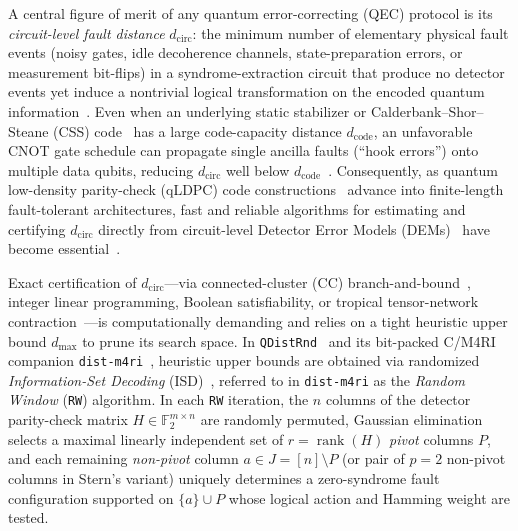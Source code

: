 \documentclass[12pt]{article}
\theoremstyle{definition}
\newcommand{\Ftwo}{\mathbb{F}_2}
\DeclareMathOperator{\rank}{rank}
\newcommand{\ttt}[1]{\texttt{#1}}
\begin{document}
A central figure of merit of any quantum error-correcting (QEC) protocol is its \emph{circuit-level fault
distance} $d_{\mathrm{circ}}$: the minimum number of elementary physical fault events (noisy gates, idle
decoherence channels, state-preparation errors, or measurement bit-flips) in a syndrome-extraction circuit that
produce no detector events yet induce a nontrivial logical transformation on the encoded quantum
information~\cite{Gottesman1997,
DennisKitaevLandahlPreskill2002,Fowler2012,BaconFlammiaHarrowShi2017,Pryadko2020MLD}. Even when an underlying
static stabilizer or Calderbank--Shor--Steane (CSS) code~\cite{CalderbankShor1996,Steane1996} has a large
code-capacity distance $d_{\mathrm{code}}$, an unfavorable CNOT gate schedule can propagate single ancilla faults
(``hook errors'') onto multiple data qubits, reducing $d_{\mathrm{circ}}$ well below
$d_{\mathrm{code}}$~\cite{DennisKitaevLandahlPreskill2002,Fowler2012,
BravyiCrossGambettaMaslovRallYoder2024,ChengGuoPan2026Tropidist}.
Consequently, as quantum low-density parity-check (qLDPC) code
constructions~\cite{BreuckmannEberhardt2021,PanteleevKalachev2022,LinPryadko2024} advance into finite-length
fault-tolerant architectures, fast and reliable algorithms for estimating and certifying $d_{\mathrm{circ}}$
directly from circuit-level Detector Error Models (DEMs)~\cite{Gidney2021Stim,DelfossePaetznick2023} have become
essential~\cite{BravyiCrossGambettaMaslovRallYoder2024,
Malcolm2025SHYPS,Bhardwaj2026Mitten,Webster2026Distance,ChengGuoPan2026Tropidist}.

Exact certification of $d_{\mathrm{circ}}$---via connected-cluster (CC) branch-and-bound~\cite{DKP17}, integer
linear programming, Boolean satisfiability, or tropical tensor-network contraction~\cite{Webster2026Distance,
ChengGuoPan2026Tropidist}---is computationally demanding and relies on a tight heuristic upper bound $d_{\max}$ to
prune its search space. In \ttt{QDistRnd}~\cite{PryadkoShabashovKozin2022QDistRnd} and its bit-packed C/M4RI
companion \ttt{dist-m4ri}~\cite{PryadkoZeng2026DistM4RI}, heuristic upper bounds are obtained via randomized
\emph{Information-Set Decoding} (ISD)~\cite{Prange1962,Leon1988,Stern1988,CanteautChabaud1998}, referred to in
\ttt{dist-m4ri} as the \emph{Random Window} (\ttt{RW}) algorithm. In each \ttt{RW} iteration, the $n$ columns of
the detector parity-check matrix $H \in \Ftwo^{m \times n}$ are randomly permuted, Gaussian elimination selects a
maximal linearly independent set of $r = \rank(H)$ \emph{pivot} columns $P$, and each remaining \emph{non-pivot}
column $a \in J = [n] \setminus P$ (or pair of $p = 2$ non-pivot columns in Stern's variant) uniquely determines a
zero-syndrome fault configuration supported on $\{a\} \cup P$ whose logical action and Hamming weight are tested.
\end{document}
